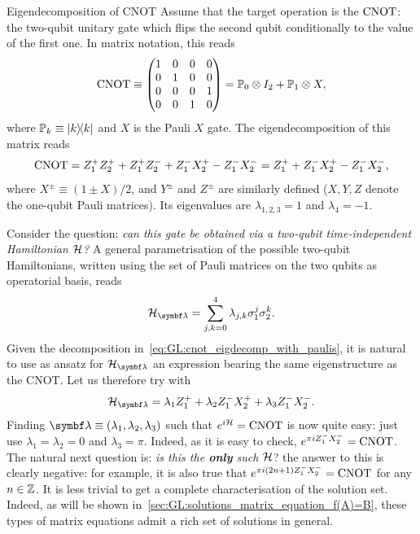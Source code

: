 \begin{examplebox}[label={ex:GL:eigendecomposition_cnot}]{Eigendecomposition of CNOT}
\fontsize{10pt}{10pt}\selectfont
Assume that the target operation is the $\operatorname{CNOT}$: the two-qubit unitary gate which flips the second qubit conditionally to the value of the first one.
In matrix notation, this reads
\begin{equation}
    \operatorname{CNOT} \equiv\begin{pmatrix}1&0&0&0 \\ 0&1&0&0 \\ 0&0&0&1\\0&0&1&0\end{pmatrix} =
    {\mathbb{P}}_0\otimes I_2 + {\mathbb{P}}_1\otimes X,
\end{equation}
where ${\mathbb{P}}_k\equiv\ketbra k$ and $X$ is the Pauli $X$ gate.
The eigendecomposition of this matrix reads
\begin{equation}
    \operatorname{CNOT} =
    Z^+_1 Z^+_2 + Z^+_1 Z^-_2
    + Z^-_1 X^+_2
    - Z^-_1 X^-_2
    = Z_1^+ + Z_1^- X_2^+ - Z_1^- X_2^-,
    \label{eq:GL:cnot_eigdecomp_with_paulis}
\end{equation}
where $X^\pm\equiv(1\pm X)/2$, and $Y^\pm$ and $Z^\pm$ are similarly defined ($X,Y,Z$ denote the one-qubit Pauli matrices).
Its eigenvalues are $\lambda_{1,2,3}=1$ and $\lambda_4=-1$.

Consider the question: \emph{can this gate be obtained via a two-qubit time-independent Hamiltonian ${\mathcal{H}}$?}
A general parametrisation of the possible two-qubit Hamiltonians, written using the set of Pauli matrices on the two qubits as operatorial basis, reads
\begin{equation}
    \calH_\bslambda =
    \sum_{j,k=0}^4 \lambda_{j,k} \sigma^j_1\sigma^k_2.
\end{equation}
Given the decomposition in~\cref{eq:GL:cnot_eigdecomp_with_paulis}, it is natural to use as ansatz for $\calH_\bslambda$ an expression bearing the same eigenstructure as the CNOT. Let us therefore try with
\begin{equation}
    \calH_\bslambda = \lambda_1 Z_1^+ + \lambda_2 Z_1^- X_2^+ + \lambda_3 Z_1^- X_2^-.
\end{equation}
Finding $\bslambda\equiv(\lambda_1,\lambda_2,\lambda_3)$ such that $e^{i{\mathcal{H}}}=\operatorname{CNOT}$ is now quite easy: just use $\lambda_1=\lambda_2=0$ and $\lambda_3=\pi$. Indeed, as it is easy to check, $e^{\pi i Z_1^- X_2^-} = \operatorname{CNOT}$.
The natural next question is: \emph{is this the \textbf{only} such ${\mathcal{H}}$}? the answer to this is clearly negative: for example, it is also true that $e^{\pi i (2n+1) Z_1^- X_2^-}=\operatorname{CNOT}$ for any $n\in{\mathbb{Z}}$.
It is less trivial to get a complete characterisation of the solution set.
Indeed, as will be shown in~\cref{sec:GL:solutions_matrix_equation_f(A)=B}, these types of matrix equations admit a rich set of solutions in general.
\end{examplebox}

